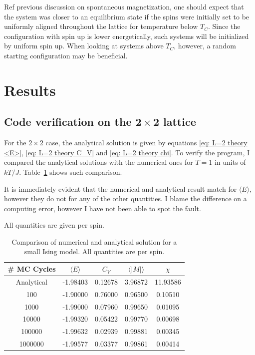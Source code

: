 \documentclass[twoside, 11pt]{article}
\begin{document}
		Ref previous discussion on spontaneous magnetization, one should expect that the system was closer to an equilibrium state if the spins were initially set to be uniformly aligned throughout the lattice for temperature below $T_C$. Since the configuration with spin up is lower energetically, such systems will be initialized by uniform spin up. When looking at systems above $T_C$, however, a random starting configuration may be beneficial. 
		
			
			
\section{Results}
	\subsection{Code verification on the $\mathbf{2\times 2}$ lattice}
		For the $2\times 2$ case, the analytical solution is given by equations \eqref{eq: L=2 theory <E>}, \eqref{eq: L=2 theory C_V} and \eqref{eq: L=2 theory chi}. To verify the program, I compared the analytical solutions with the numerical ones for $T=1$ in units of $kT/J$. Table~\ref{table: L=2 compare theory + numerical} shows such comparison.
		
		It is immediately evident that the numerical and analytical result match for $\langle E \rangle$, however they do not for any of the other quantities. I blame the difference on a computing error, however I have not been able to spot the fault. 
		
		All quantities are given per spin.
		\begin{table}
			\centering
			\caption{Comparison of numerical and analytical solution for a small Ising model. All quantities are per spin.}
			\label{table: L=2 compare theory + numerical}
			\begin{tabular}{c | c | c | c | c}
\# MC Cycles 	&	$\langle E \rangle$	&	$C_V$	&	$\langle |M| \rangle$ 	&	$\chi$ \\ \hline
Analytical 	&	-1.98403			&	0.12678	&	3.96872	&	11.93586 \\
100 		&	-1.90000		&	0.76000		&	0.96500	&	0.10510	\\
1000 		&	-1.99000		&	0.07960		&	0.99650	&	0.01095	\\
10000 		&	-1.99320		&	0.05422		&	0.99770	&	0.00698	\\
100000 		&	-1.99632		&	0.02939		&	0.99881	&	0.00345	\\
1000000 		&	-1.99577		&	0.03377		&	0.99861	&	0.00414	
			\end{tabular}
		\end{table}
	
\end{document}
